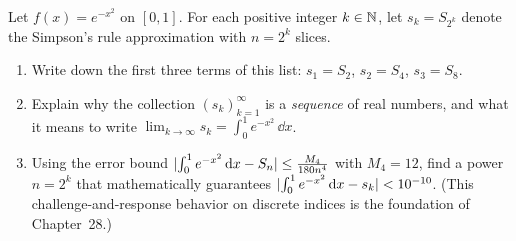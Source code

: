 \begin{exercise}
Let $f(x) = e^{-x^2}$ on $[0,1]$. For each positive integer $k \in \mathbb{N}$, let $s_k = S_{2^k}$ denote the Simpson's rule approximation with $n = 2^k$ slices.
\begin{enumerate}[label=(\alph*)]
\item Write down the first three terms of this list: $s_1 = S_2$, $s_2 = S_4$, $s_3 = S_8$.
\item Explain why the collection $(s_k)_{k=1}^\infty$ is a \emph{sequence} of real numbers, and what it means to write $\lim_{k \to \infty} s_k = \int_0^1 e^{-x^2}\,\dd x$.
\item Using the error bound $\lvert\int_0^1 e^{-x^2}\,\mathrm{d} x - S_n\rvert \le \frac{M_4}{180 n^4}$ with $M_4 = 12$, find a power $n = 2^k$ that mathematically guarantees $\lvert\int_0^1 e^{-x^2}\,\mathrm{d} x - s_k\rvert < 10^{-10}$. (This challenge-and-response behavior on discrete indices is the foundation of Chapter~28.)
\end{enumerate}
\end{exercise}
